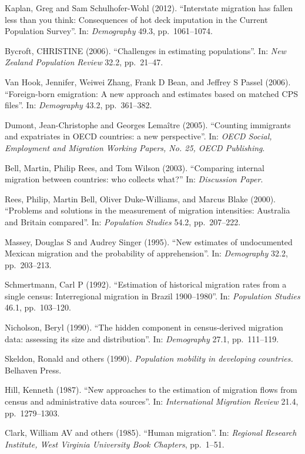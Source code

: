 \documentclass[
  12pt,
]{article}
\begin{document}
Kaplan, Greg and Sam Schulhofer-Wohl (2012). ``Interstate migration has
fallen less than you think: Consequences of hot deck imputation in the
Current Population Survey''. In: \emph{Demography} 49.3, pp.~1061--1074.

Bycroft, CHRISTINE (2006). ``Challenges in estimating populations''. In:
\emph{New Zealand Population Review} 32.2, pp.~21--47.

Van Hook, Jennifer, Weiwei Zhang, Frank D Bean, and Jeffrey S Passel
(2006). ``Foreign-born emigration: A new approach and estimates based on
matched CPS files''. In: \emph{Demography} 43.2, pp.~361--382.

Dumont, Jean-Christophe and Georges Lemaître (2005). ``Counting
immigrants and expatriates in OECD countries: a new perspective''. In:
\emph{OECD Social, Employment and Migration Working Papers, No. 25, OECD Publishing}.

Bell, Martin, Philip Rees, and Tom Wilson (2003). ``Comparing internal
migration between countries: who collects what?'' In:
\emph{Discussion Paper}.

Rees, Philip, Martin Bell, Oliver Duke-Williams, and Marcus Blake
(2000). ``Problems and solutions in the measurement of migration
intensities: Australia and Britain compared''. In:
\emph{Population Studies} 54.2, pp.~207--222.

Massey, Douglas S and Audrey Singer (1995). ``New estimates of
undocumented Mexican migration and the probability of apprehension''.
In: \emph{Demography} 32.2, pp.~203--213.

Schmertmann, Carl P (1992). ``Estimation of historical migration rates
from a single census: Interregional migration in Brazil 1900--1980''.
In: \emph{Population Studies} 46.1, pp.~103--120.

Nicholson, Beryl (1990). ``The hidden component in census-derived
migration data: assessing its size and distribution''. In:
\emph{Demography} 27.1, pp.~111--119.

Skeldon, Ronald and others (1990).
\emph{Population mobility in developing countries.} Belhaven Press.

Hill, Kenneth (1987). ``New approaches to the estimation of migration
flows from census and administrative data sources''. In:
\emph{International Migration Review} 21.4, pp.~1279--1303.

Clark, William AV and others (1985). ``Human migration''. In:
\emph{Regional Research Institute, West Virginia University Book Chapters},
pp.~1--51.
\end{document}
